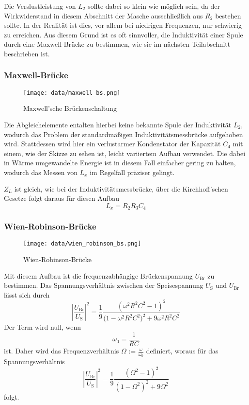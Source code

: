Die Verslustleistung von $L_2$ sollte dabei so klein wie möglich sein, da der Wirkwiderstand in diesem Abschnitt
der Masche
ausschließlich aus $R_2$ bestehen sollte. In der Realität ist dies, vor allem bei niedrigen Frequenzen, nur schwierig 
zu erreichen. Aus diesem Grund ist es oft sinnvoller, die Induktivität einer Spule durch eine Maxwell-Brücke zu 
bestimmen, wie sie im nächsten Teilabschnitt beschrieben ist.

\subsubsection{Maxwell-Brücke}

\begin{figure}
\centering
\texttt{[image: data/maxwell\_bs.png]}
\caption{Maxwell'sche Brückenschaltung}
\label{fig:maxwell}
\end{figure}
Die Abgleichelemente entalten hierbei keine bekannte Spule der Induktivität $L_2$, wodurch das Problem der 
standardmäßigen Induktivitätsmessbrücke aufgehoben wird. Stattdessen wird hier ein verlustarmer Kondenstator
der Kapazität $C_4$ mit einem, wie der Skizze zu sehen ist, leicht variiertem Aufbau verwendet. Die dabei
in Wärme umgewandelte Energie ist in diesem Fall einfacher gering zu halten, wodurch das Messen von $L_x$
im Regelfall präziser gelingt.

$Z_L$ ist gleich, wie bei der Induktivitätsmessbrücke, über die Kirchhoff'schen Gesetze folgt daraus für
diesen Aufbau \begin{equation}
\label{eqn:maxwell}
    L_x = R_2 R_3 C_4
\end{equation}

\subsubsection{Wien-Robinson-Brücke}
\label{sec:wien}
\begin{figure}
\centering
\texttt{[image: data/wien\_robinson\_bs.png]}
\caption{Wien-Robinson-Brücke}
\label{fig:wien}
\end{figure}
Mit diesem Aufbau ist die frequenzabhängige Brückenspannung $U_{\text{Br}}$ zu bestimmen. Das Spannungsverhältnis
zwischen der Speisespannung $U_{\text{S}}$ und $U_{\text{Br}}$ lässt sich durch \begin{equation}
    \left|\frac{U_{\text{Br}}}{U_{\text{S}}}\right|^2 = \frac{1}{9}\frac{(\omega^2 R^2 C^2 -1)^2}{\bigl (1- \omega^2 R^2 C^2\bigr)^2 + 9\omega^2 R^2 C^2} 	
\end{equation}
Der Term wird null, wenn \begin{equation}
    \omega_0 = \frac{1}{RC}
\end{equation} ist. Daher wird das Frequenzverhältnis $\Omega$ := $\frac{\omega}{\omega_0}$ definiert, woraus für das
Spannungsverhältnis \begin{equation}
\label{eqn:u}
    \left|\frac{U_{\text{Br}}}{U_{\text{S}}}\right|^2 = \frac{1}{9}\frac{(\Omega^2 -1)^2}{(1- \Omega^2)^2 + 9\Omega^2}
\end{equation} folgt.


